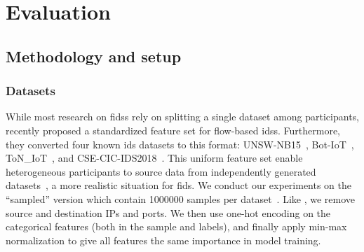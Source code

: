 \section{Evaluation}\label{sec:eval}


\subsection{Methodology and setup\label{sec:eval.methodo}}
\subsubsection{Datasets\label{sec:eval.methodo.datasets}}
While most research on \glspl{fids} rely on splitting a single dataset among participants,
\citet{sarhan_standardfeatureset_2021} recently proposed a standardized feature set for flow-based \glspl{ids}. 
Furthermore, they converted four known \gls{ids} datasets to this format: UNSW-NB15~\cite{moustafa_unsw-nb15_2015}, Bot-IoT~\cite{koroniotis_towards_2019}, ToN\_IoT~\cite{moustafa_federatedtoniot_2020}, and CSE-CIC-IDS2018~\cite{sharafaldin_toward_2018}. 
This uniform feature set enable heterogeneous participants to source data from independently generated datasets~\cite{popoola_federated_2021,de_carvalho_bertoli_generalizing_2023}, a more realistic situation for \gls{fids}. 
We conduct our experiments on the ``sampled'' version which contain 1000000 samples per dataset~\cite{layeghy_generalisability_2022}. 
Like \citet{de_carvalho_bertoli_generalizing_2023}, we remove source and destination IPs and ports.
We then use one-hot encoding on the categorical features (both in the sample and labels), and finally apply min-max normalization to give all features the same importance in model training.


